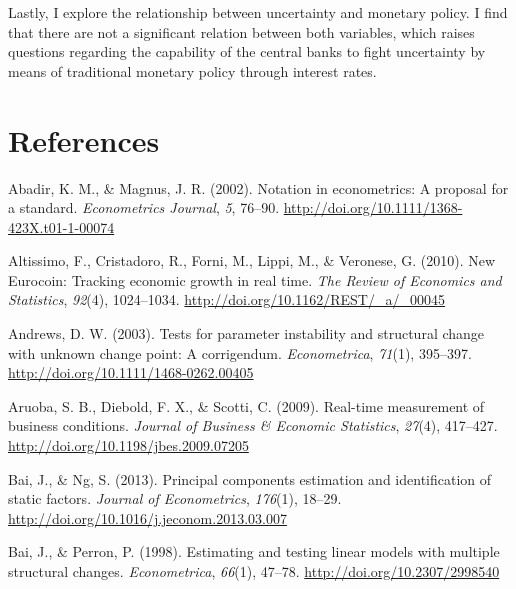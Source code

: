 \documentclass[12pt,twoside]{reedthesis}
\begin{document}
Lastly, I explore the relationship between uncertainty and monetary policy. I find that there are not a significant relation between both variables, which raises questions regarding the capability of the central banks to fight uncertainty by means of traditional monetary policy through interest rates.

\backmatter

\hypertarget{references}{%
\chapter*{References}\label{references}}


\noindent

\setlength{\parindent}{-0.20in}
\setlength{\leftskip}{0.20in}
\setlength{\parskip}{8pt}

\hypertarget{refs}{}
\leavevmode\hypertarget{ref-abadmagn:2002}{}%
Abadir, K. M., \& Magnus, J. R. (2002). Notation in econometrics: A proposal for a standard. \emph{Econometrics Journal}, \emph{5}, 76--90. \url{http://doi.org/10.1111/1368-423X.t01-1-00074}

\leavevmode\hypertarget{ref-altietal:2010}{}%
Altissimo, F., Cristadoro, R., Forni, M., Lippi, M., \& Veronese, G. (2010). New Eurocoin: Tracking economic growth in real time. \emph{The Review of Economics and Statistics}, \emph{92}(4), 1024--1034. \url{http://doi.org/10.1162/REST/_a/_00045}

\leavevmode\hypertarget{ref-andrews:2003}{}%
Andrews, D. W. (2003). Tests for parameter instability and structural change with unknown change point: A corrigendum. \emph{Econometrica}, \emph{71}(1), 395--397. \url{http://doi.org/10.1111/1468-0262.00405}

\leavevmode\hypertarget{ref-aruoetal:2009}{}%
Aruoba, S. B., Diebold, F. X., \& Scotti, C. (2009). Real-time measurement of business conditions. \emph{Journal of Business \& Economic Statistics}, \emph{27}(4), 417--427. \url{http://doi.org/10.1198/jbes.2009.07205}

\leavevmode\hypertarget{ref-baing:2013}{}%
Bai, J., \& Ng, S. (2013). Principal components estimation and identification of static factors. \emph{Journal of Econometrics}, \emph{176}(1), 18--29. \url{http://doi.org/10.1016/j.jeconom.2013.03.007}

\leavevmode\hypertarget{ref-baiperr:1998}{}%
Bai, J., \& Perron, P. (1998). Estimating and testing linear models with multiple structural changes. \emph{Econometrica}, \emph{66}(1), 47--78. \url{http://doi.org/10.2307/2998540}
\end{document}
